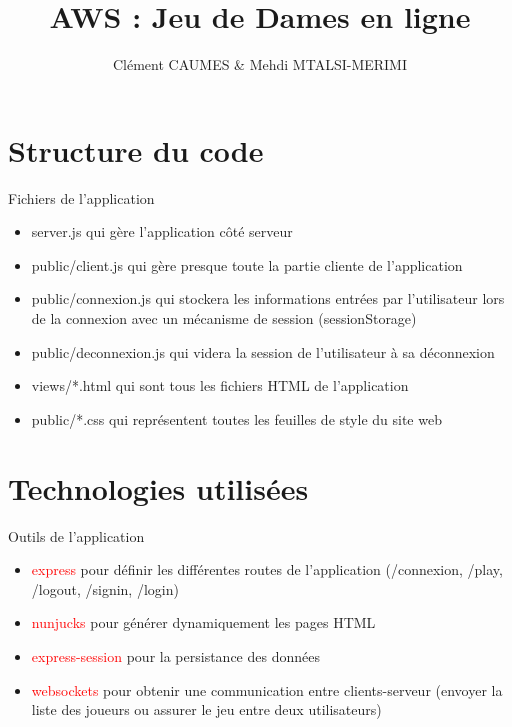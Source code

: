\documentclass{beamer}
\title{AWS : Jeu de Dames en ligne}
\author{Clément CAUMES \& Mehdi MTALSI-MERIMI}
\institute{UFR des Sciences Versailles - M1 Informatique}
\begin{document}
  	
  \begin{frame}
  	\titlepage
  \end{frame}

\section{Structure du code}

\begin{frame}
\begin{block}{Fichiers de l'application} 
	\begin{itemize}
		[circle]
		\item server.js qui gère l'application côté serveur
		\item public/client.js qui gère presque toute la partie cliente de l'application
		\item public/connexion.js qui stockera les informations entrées par l'utilisateur lors de la connexion avec un 
		mécanisme de session (sessionStorage)
		\item public/deconnexion.js qui videra la session de l'utilisateur à sa déconnexion
		\item views/*.html qui sont tous les fichiers HTML de l'application
		\item public/*.css qui représentent toutes les feuilles de style du site web
	\end{itemize}
\end{block}
\end{frame}

\section{Technologies utilisées}

\begin{frame}
\begin{block}{Outils de l'application} 
	\begin{itemize}
		[circle]
		\item \textcolor{red}{express} pour définir les différentes routes de l'application (/connexion, /play, /logout, /signin, /login)
		\item \textcolor{red}{nunjucks} pour générer dynamiquement les pages HTML
		\item \textcolor{red}{express-session} pour la persistance des données
		\item \textcolor{red}{websockets} pour obtenir une communication entre clients-serveur (envoyer la liste des joueurs ou assurer le jeu entre deux utilisateurs)
	\end{itemize}
\end{block}
\end{frame}
\end{document}
